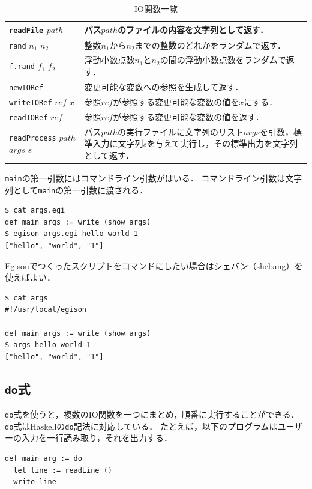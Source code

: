 \begin{table}[h]
\begin{center}
\begin{tabular}{ | l | p{9.5cm} |}
    \texttt{readFile} $path$ & パス$path$のファイルの内容を文字列として返す． \\ \hline
    \texttt{rand} $n_1$ $n_2$ & 整数$n_1$から$n_2$までの整数のどれかをランダムで返す． \\ \hline
    \texttt{f.rand} $f_1$ $f_2$ & 浮動小数点数$n_1$と$n_2$の間の浮動小数点数をランダムで返す． \\ \hline
    \texttt{newIORef} & 変更可能な変数への参照を生成して返す． \\ \hline
    \texttt{writeIORef} $ref$ $x$ & 参照$ref$が参照する変更可能な変数の値を$x$にする． \\ \hline
    \texttt{readIORef} $ref$ & 参照$ref$が参照する変更可能な変数の値を返す． \\ \hline
    \texttt{readProcess} $path$ $args$ $s$ & パス$path$の実行ファイルに文字列のリスト$args$を引数，標準入力に文字列$s$を与えて実行し，その標準出力を文字列として返す． \\ \hline
    \end{tabular}
\end{center}
    \caption{IO関数一覧}
    \label{tab:ioFunctions}
\end{table}

\lstinline{main}の第一引数にはコマンドライン引数がはいる．
コマンドライン引数は文字列として\lstinline{main}の第一引数に渡される．
\begin{lstlisting}[language=egison,numbers=none]
$ cat args.egi
def main args := write (show args)
$ egison args.egi hello world 1
["hello", "world", "1"]
\end{lstlisting}

Egisonでつくったスクリプトをコマンドにしたい場合はシェバン（shebang）を使えばよい．
\begin{lstlisting}[language=egison,numbers=none]
$ cat args
#!/usr/local/egison
  
def main args := write (show args)
$ args hello world 1
["hello", "world", "1"]
\end{lstlisting}

\subsection{\texttt{do}式}

\lstinline{do}式を使うと，複数のIO関数を一つにまとめ，順番に実行することができる．
\lstinline{do}式はHaskellの\lstinline{do}記法に対応している．
たとえば，以下のプログラムはユーザーの入力を一行読み取り，それを出力する．
\begin{lstlisting}[language=egison,numbers=none]
def main arg := do
  let line := readLine ()
  write line
\end{lstlisting}

